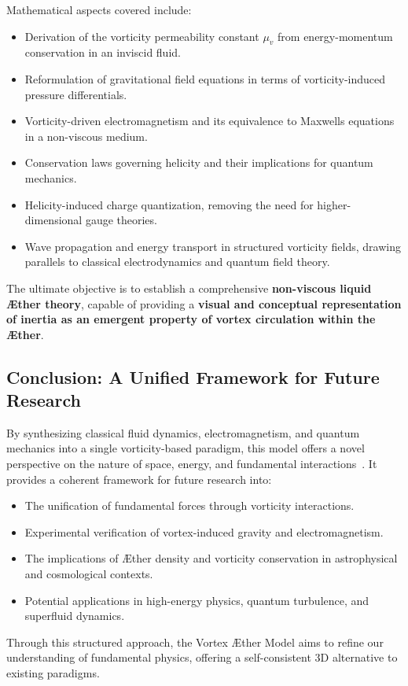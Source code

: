 Mathematical aspects covered include:
\begin{itemize}
    \item Derivation of the vorticity permeability constant \( \mu_v \) from energy-momentum conservation in an inviscid fluid.
    \item Reformulation of gravitational field equations in terms of vorticity-induced pressure differentials.
    \item Vorticity-driven electromagnetism and its equivalence to Maxwell\rqs s equations in a non-viscous medium.
    \item Conservation laws governing helicity and their implications for quantum mechanics.
    \item Helicity-induced charge quantization, removing the need for higher-dimensional gauge theories.
    \item Wave propagation and energy transport in structured vorticity fields, drawing parallels to classical electrodynamics and quantum field theory.
\end{itemize}
The ultimate objective is to establish a comprehensive \textbf{non-viscous liquid Æther theory}, capable of providing a \textbf{visual and conceptual representation of inertia as an emergent property of vortex circulation within the Æther}.

\subsection*{Conclusion: A Unified Framework for Future Research}
By synthesizing classical fluid dynamics, electromagnetism, and quantum mechanics into a single vorticity-based paradigm, this model offers a novel perspective on the nature of space, energy, and fundamental interactions~\cite{Polchinski1998}. It provides a coherent framework for future research into:
\begin{itemize}
    \item The unification of fundamental forces through vorticity interactions.
    \item Experimental verification of vortex-induced gravity and electromagnetism.
    \item The implications of Æther density and vorticity conservation in astrophysical and cosmological contexts.
    \item Potential applications in high-energy physics, quantum turbulence, and superfluid dynamics.
\end{itemize}

Through this structured approach, the Vortex Æther Model aims to refine our understanding of fundamental physics, offering a self-consistent 3D alternative to existing paradigms.